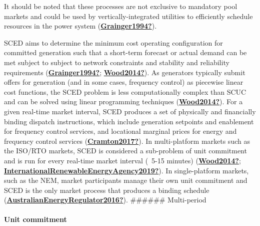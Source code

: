 \documentclass[12pt,a4paper,]{report}
\begin{document}
It should be noted that these processes are not exclusive to mandatory
pool markets and could be used by vertically-integrated utilities to
efficiently schedule resources in the power system
(\protect\hyperlink{ref-Grainger1994}{\textbf{Grainger1994?}}).

SCED aims to determine the minimum cost operating configuration for
committed generation such that a short-term forecast or actual demand
can be met subject to subject to network constraints and stability and
reliability requirements
(\protect\hyperlink{ref-Grainger1994}{\textbf{Grainger1994?}};
\protect\hyperlink{ref-Wood2014}{\textbf{Wood2014?}}). As generators
typically submit offers for generation (and in some cases, frequency
control) as piecewise linear cost functions, the SCED problem is less
computationally complex than SCUC and can be solved using linear
programming techniques
(\protect\hyperlink{ref-Wood2014}{\textbf{Wood2014?}}). For a given
real-time market interval, SCED produces a set of physically and
financially binding dispatch instructions, which include generation
setpoints and enablement for frequency control services, and locational
marginal prices for energy and frequency control services
(\protect\hyperlink{ref-Cramton2017}{\textbf{Cramton2017?}}). In
multi-platform markets such as the ISO/RTO markets, SCED is considered a
sub-problem of unit commitment and is run for every real-time market
interval (~5-15 minutes)
(\protect\hyperlink{ref-Wood2014}{\textbf{Wood2014?}};
\protect\hyperlink{ref-InternationalRenewableEnergyAgency2019}{\textbf{InternationalRenewableEnergyAgency2019?}}).
In single-platform markets, such as the NEM, market participants manage
their own unit commitment and SCED is the only market process that
produces a binding schedule
(\protect\hyperlink{ref-AustralianEnergyRegulator2016}{\textbf{AustralianEnergyRegulator2016?}}).
\#\#\#\#\#\# Multi-period

\hypertarget{unit-commitment}{%
\paragraph{Unit commitment}\label{unit-commitment}}
\end{document}
